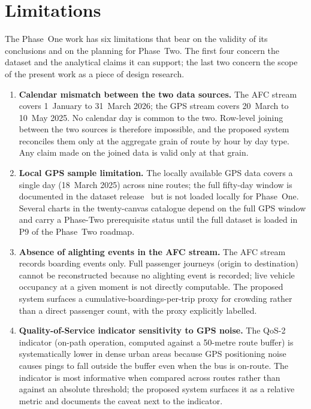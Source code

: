 \section{Limitations}
\label{sec:conclusion:limitations}

The Phase~One work has six limitations that bear on the validity of
its conclusions and on the planning for Phase~Two. The first four
concern the dataset and the analytical claims it can support; the last
two concern the scope of the present work as a piece of design
research.

\begin{enumerate}
    \item \textbf{Calendar mismatch between the two data sources.}
    The AFC stream covers 1~January to 31~March 2026; the GPS stream
    covers 20~March to 10~May 2025. No calendar day is common to the
    two. Row-level joining between the two sources is therefore
    impossible, and the proposed system reconciles them only at the
    aggregate grain of route by hour by day type. Any claim made on
    the joined data is valid only at that grain.

    \item \textbf{Local GPS sample limitation.} The locally available
    GPS data covers a single day (18~March 2025) across nine routes;
    the full fifty-day window is documented in the dataset
    release~\cite{hcmcgps2025} but is not loaded locally for
    Phase~One. Several charts in the twenty-canvas catalogue depend
    on the full GPS window and carry a Phase-Two prerequisite status
    until the full dataset is loaded in P9 of the Phase~Two roadmap.

    \item \textbf{Absence of alighting events in the AFC stream.}
    The AFC stream records boarding events only. Full passenger
    journeys (origin to destination) cannot be reconstructed because
    no alighting event is recorded; live vehicle occupancy at a given
    moment is not directly computable. The proposed system surfaces a
    cumulative-boardings-per-trip proxy for crowding rather than a
    direct passenger count, with the proxy explicitly labelled.

    \item \textbf{Quality-of-Service indicator sensitivity to GPS
    noise.} The QoS-2 indicator (on-path operation, computed against
    a 50-metre route buffer) is systematically lower in dense urban
    areas because GPS positioning noise causes pings to fall outside
    the buffer even when the bus is on-route. The indicator is most
    informative when compared across routes rather than against an
    absolute threshold; the proposed system surfaces it as a relative
    metric and documents the caveat next to the indicator.


\end{enumerate}
